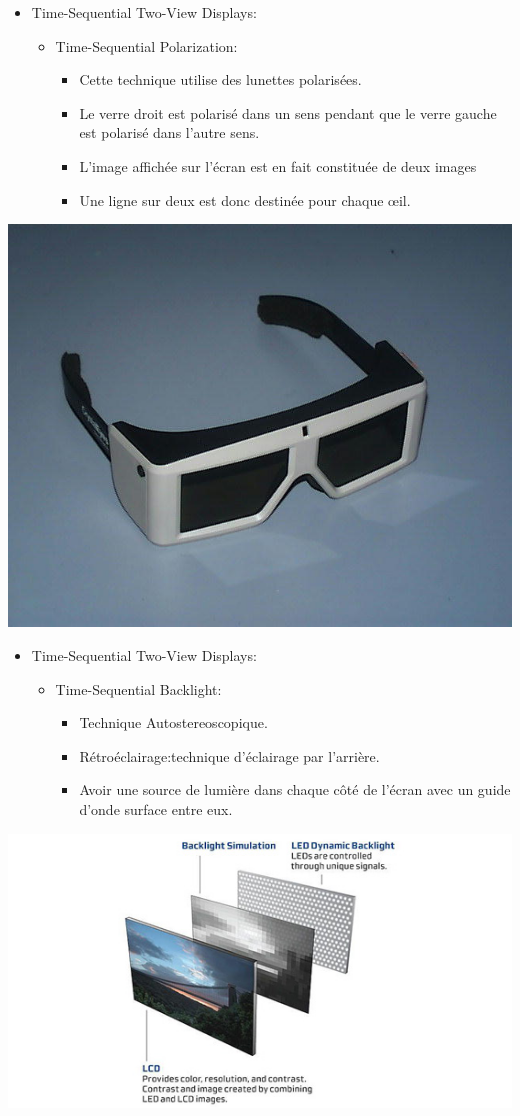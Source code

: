 \begin{frame}		  	
  \begin{itemize}
  \item Time-Sequential Two-View Displays:
    \begin{itemize}
    \item Time-Sequential Polarization:
      \begin{itemize}
      \item Cette technique utilise des lunettes polarisées.
      \item Le verre droit est polarisé dans un sens pendant que le verre gauche est polarisé dans l’autre    sens.
      \item L’image affichée sur l’écran est en fait constituée de deux images
      \item Une ligne sur deux est donc destinée pour chaque œil.
      \end{itemize}
    \end{itemize}
  \end{itemize}
  \includegraphics[keepaspectratio,height=.2\linewidth]{2.jpg}
\end{frame}

\begin{frame}
  \begin{itemize}
  \item Time-Sequential Two-View Displays:
    \begin{itemize}
    \item Time-Sequential Backlight:
      \begin{itemize}
      \item Technique Autostereoscopique.
      \item Rétroéclairage:technique d'éclairage par l'arrière.
      \item Avoir une source de lumière dans chaque côté de l'écran avec un guide d'onde surface entre eux.

      \end{itemize}
    \end{itemize}
  \end{itemize}
  \includegraphics[keepaspectratio,height=.2\linewidth]{3.jpg}
\end{frame}


